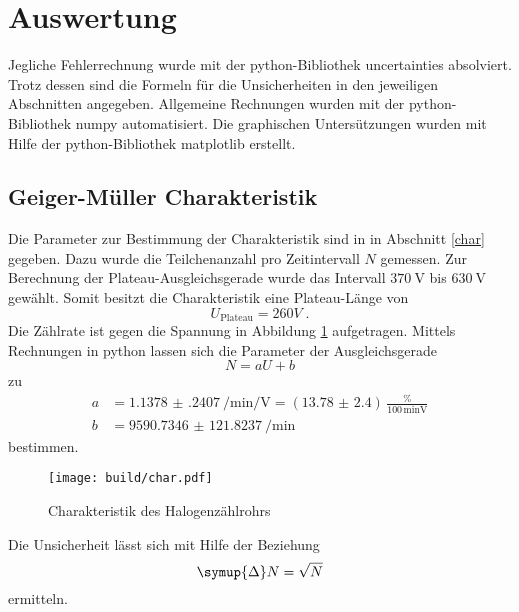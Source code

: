 \section{Auswertung}
Jegliche Fehlerrechnung wurde mit der python-Bibliothek uncertainties \cite{uncertainties} absolviert.
Trotz dessen sind die Formeln für die Unsicherheiten in den jeweiligen Abschnitten angegeben.
Allgemeine Rechnungen wurden mit der python-Bibliothek numpy \cite{numpy} automatisiert. 
Die graphischen Untersützungen wurden mit Hilfe der python-Bibliothek matplotlib \cite{matplotlib} erstellt.
\label{sec:Auswertung}
\subsection{Geiger-Müller Charakteristik}
Die Parameter zur Bestimmung der Charakteristik sind in in Abschnitt \ref{char} gegeben.
Dazu wurde die Teilchenanzahl pro Zeitintervall $N$ gemessen.
Zur Berechnung der Plateau-Ausgleichsgerade wurde das Intervall $\SI{370}{\volt}$ bis $\SI{630}{\volt}$ gewählt.
Somit besitzt die Charakteristik eine Plateau-Länge von 
\begin{equation*}
  U_\text{Plateau} = 260 V \;\text{.}
\end{equation*}
Die Zählrate ist gegen die Spannung in Abbildung \ref{fig:char} aufgetragen.
Mittels Rechnungen in python lassen sich die Parameter der Ausgleichsgerade 
\begin{equation}
  N = aU + b
\end{equation}
zu 
\begin{align*}
  a &= \SI{1.1378(2407)}{\per\minute\per\volt} = ( \num{13.78(240)}) \,\frac{\si{\percent}}{100 \, \si{\minute\volt}} \\
  b &= \SI{9590.7346(1218237)}{\per\minute}
\end{align*}
bestimmen.
\begin{figure}
  \centering
  \caption{Charakteristik des Halogenzählrohrs}
  \label{fig:char}
  \texttt{[image: build/char.pdf]}
\end{figure}
Die Unsicherheit lässt sich mit Hilfe der Beziehung 
\begin{equation}
  \symup{\Delta} N = \sqrt{N}
\end{equation}
ermitteln.
